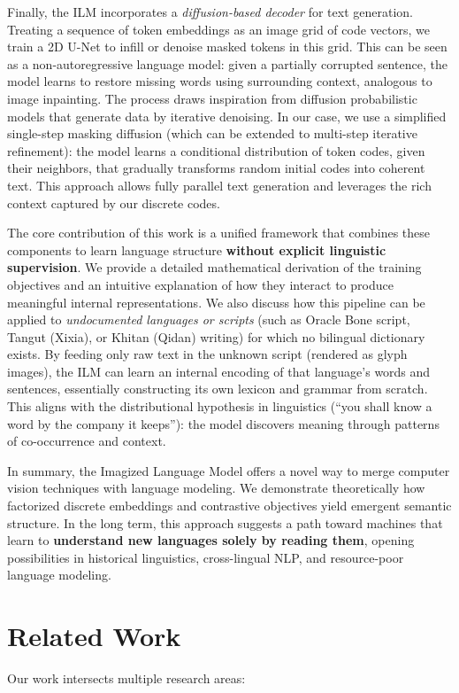 \documentclass[10pt,twocolumn]{article}
\begin{document}
Finally, the ILM incorporates a \emph{diffusion-based decoder} for text generation. Treating a sequence of token embeddings as an image grid of code vectors, we train a 2D U-Net to infill or denoise masked tokens in this grid. This can be seen as a non-autoregressive language model: given a partially corrupted sentence, the model learns to restore missing words using surrounding context, analogous to image inpainting. The process draws inspiration from diffusion probabilistic models \citep{austin2021d3pm} that generate data by iterative denoising. In our case, we use a simplified single-step masking diffusion (which can be extended to multi-step iterative refinement): the model learns a conditional distribution of token codes, given their neighbors, that gradually transforms random initial codes into coherent text. This approach allows fully parallel text generation and leverages the rich context captured by our discrete codes.

The core contribution of this work is a unified framework that combines these components to learn language structure \textbf{without explicit linguistic supervision}. We provide a detailed mathematical derivation of the training objectives and an intuitive explanation of how they interact to produce meaningful internal representations. We also discuss how this pipeline can be applied to \emph{undocumented languages or scripts} (such as Oracle Bone script, Tangut (Xixia), or Khitan (Qidan) writing) for which no bilingual dictionary exists. By feeding only raw text in the unknown script (rendered as glyph images), the ILM can learn an internal encoding of that language's words and sentences, essentially constructing its own lexicon and grammar from scratch. This aligns with the distributional hypothesis in linguistics (``you shall know a word by the company it keeps''): the model discovers meaning through patterns of co-occurrence and context.

In summary, the Imagized Language Model offers a novel way to merge computer vision techniques with language modeling. We demonstrate theoretically how factorized discrete embeddings and contrastive objectives yield emergent semantic structure. In the long term, this approach suggests a path toward machines that learn to \textbf{understand new languages solely by reading them}, opening possibilities in historical linguistics, cross-lingual NLP, and resource-poor language modeling.

\section{Related Work}
Our work intersects multiple research areas:
\end{document}
